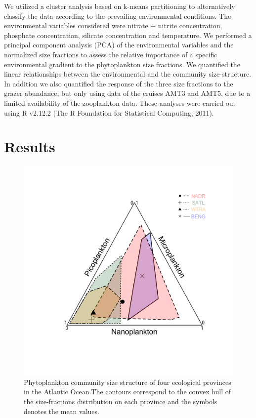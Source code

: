 We utilized a cluster analysis based on k-means partitioning to alternatively classify the data according to the prevailing environmental conditions. The environmental variables considered were nitrate + nitrite concentration, phosphate concentration, silicate concentration and temperature. We performed a principal component analysis (PCA) of the environmental variables and the normalized size fractions to assess the relative importance of a specific environmental gradient to the phytoplankton size fractions. We quantified the linear relationships between the environmental and the community size-structure. In addition we also quantified the response of the three size fractions to the grazer abundance, but only using data of the cruises AMT3 and AMT5, due to a limited availability of the zooplankton data. These analyses were carried out using R v2.12.2 (The R Foundation for Statistical Computing, 2011).

\section{Results}

\begin{figure}
\centering
\includegraphics[trim = 20mm 30mm 20mm 20mm, clip, width=0.5\linewidth]{./Chp2-Pre/amt_4RegionsTriSizeFrac4.png}
\caption[Scheme]{\small {Phytoplankton community size structure of four ecological provinces in the Atlantic Ocean.The contours correspond to the convex hull of the size-fractions distribution on each province and the symbols denotes the mean values.}}
\label{RegSizeFrac}
\end{figure}

